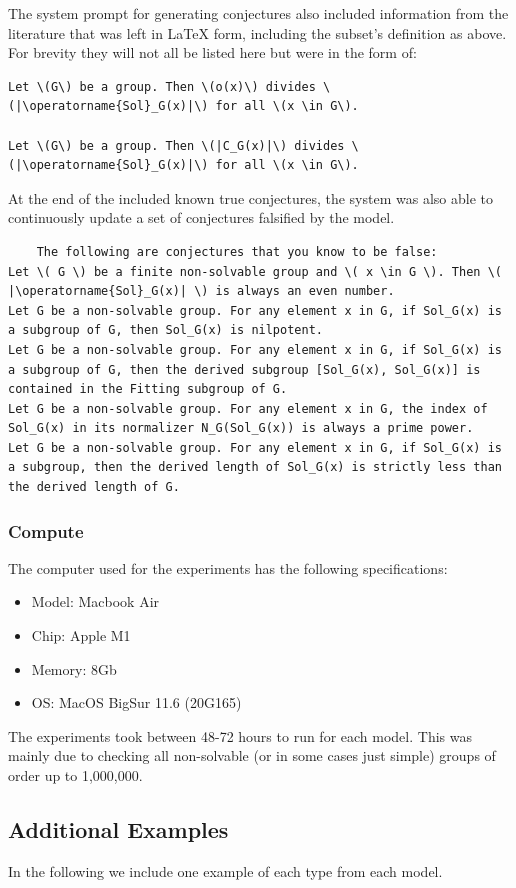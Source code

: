 \documentclass{article}
\begin{document}
The system prompt for generating conjectures also included information from the literature that was left in LaTeX form, including the subset's definition as above. For brevity they will not all be listed here but were in the form of:
\begin{lstlisting}
Let \(G\) be a group. Then \(o(x)\) divides \(|\operatorname{Sol}_G(x)|\) for all \(x \in G\).
     
Let \(G\) be a group. Then \(|C_G(x)|\) divides \(|\operatorname{Sol}_G(x)|\) for all \(x \in G\).
\end{lstlisting}
At the end of the included known true conjectures, the system was also able to continuously update a set of conjectures falsified by the model. 
\begin{lstlisting}
    The following are conjectures that you know to be false:
Let \( G \) be a finite non-solvable group and \( x \in G \). Then \( |\operatorname{Sol}_G(x)| \) is always an even number.
Let G be a non-solvable group. For any element x in G, if Sol_G(x) is a subgroup of G, then Sol_G(x) is nilpotent.
Let G be a non-solvable group. For any element x in G, if Sol_G(x) is a subgroup of G, then the derived subgroup [Sol_G(x), Sol_G(x)] is contained in the Fitting subgroup of G.
Let G be a non-solvable group. For any element x in G, the index of Sol_G(x) in its normalizer N_G(Sol_G(x)) is always a prime power.
Let G be a non-solvable group. For any element x in G, if Sol_G(x) is a subgroup, then the derived length of Sol_G(x) is strictly less than the derived length of G.
\end{lstlisting}
\subsubsection{Compute}\label{computer}
The computer used for the experiments has the following specifications:
\begin{itemize}
    \item Model: Macbook Air
    \item Chip: Apple M1
    \item Memory: 8Gb
    \item OS: MacOS BigSur 11.6 (20G165)
\end{itemize}
The experiments took between 48-72 hours to run for each model. This was mainly due to checking all non-solvable (or in some cases just simple) groups of order up to 1,000,000. 
\subsection{Additional Examples}\label{additional_examples}
In the following we include one example of each type from each model. 
\end{document}
